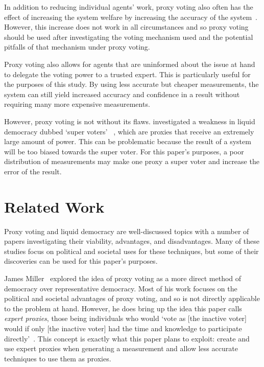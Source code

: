 In addition to reducing individual agents' work, proxy voting also often has
the effect of increasing the system welfare by increasing the accuracy of the
system~\cite[sec.~1.1]{Cohensius2017}.
However, this increase does not work in all circumstances and so proxy voting
should be used after investigating the voting mechanism used and the potential
pitfalls of that mechanism under proxy voting.

Proxy voting also allows for agents that are uninformed about the issue at hand to
delegate the voting power to a trusted expert.
This is particularly useful for the purposes of this study.
By using less accurate but cheaper measurements, the system can still yield
increased accuracy and confidence in a result without requiring many more
expensive measurements.

However, proxy voting is not without its flaws.
 investigated a weakness in liquid democracy dubbed `super voters'
~\cite[para.~1.3]{Golz2021}, which are proxies that receive an extremely large
amount of power.
This can be problematic because the result of a system will be too biased
towards the super voter.
For this paper's purposes, a poor distribution of measurements may make one
proxy a super voter and increase the error of the result.


\section{Related Work}\label{sec:related-work}
Proxy voting and liquid democracy are well-discussed topics with a number of
papers investigating their viability, advantages, and disadvantages.
Many of these studies focus on political and societal uses for these techniques,
but some of their discoveries can be used for this paper's purposes.

James Miller~\cite{Miller1969} explored the idea of proxy voting as a more
direct method of democracy over representative democracy.
Most of his work focuses on the political and societal advantages of proxy
voting, and so is not directly applicable to the problem at hand.
However, he does bring up the idea this paper calls \textit{expert proxies},
those being individuals who would `vote as [the inactive voter] would if only
[the inactive voter] had the time and knowledge to participate
directly'~\cite[para.~1.3]{Miller1969}.
This concept is exactly what this paper plans to exploit: create and use expert
proxies when generating a measurement and allow less accurate techniques to use
them as proxies.

